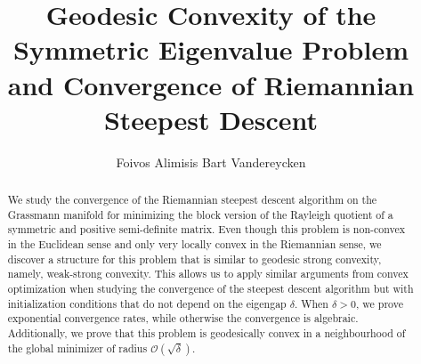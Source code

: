 \documentclass[hidelinks]{article}
\title{Geodesic Convexity of the Symmetric Eigenvalue Problem and Convergence of Riemannian Steepest Descent}
\date{}
\author{Foivos Alimisis  \hspace{4mm}  Bart Vandereycken }
\affil{Department of Mathematics, University of Geneva}
\newcommand{\bigO}{\mathcal{O}}
\begin{document}
\maketitle


\begin{abstract}    
We study the convergence of the Riemannian steepest descent algorithm on the Grassmann manifold for minimizing the block version of the Rayleigh quotient of a symmetric and positive semi-definite matrix. Even though this problem is non-convex in the Euclidean sense and only very locally convex in the Riemannian sense, we discover a structure for this problem that is similar to geodesic strong convexity, namely, weak-strong convexity. This allows us to apply similar arguments from convex optimization when studying the convergence of the steepest descent algorithm but with initialization conditions that do not depend on the eigengap $\delta$. When $\delta>0$, we prove exponential convergence rates, while otherwise the convergence is algebraic. Additionally, we prove that this problem is geodesically convex in a neighbourhood of the global minimizer of radius $\bigO(\sqrt{\delta})$.
\end{abstract}





























\end{document}
